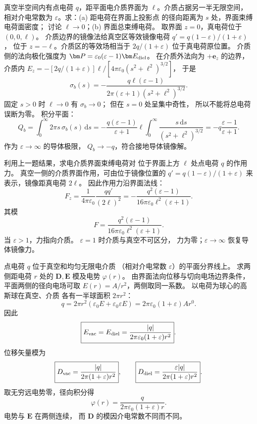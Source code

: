 真空半空间内有点电荷 $q$，距平面电介质界面为
$\ell$。介质占据另一半无限空间，相对介电常数为
$\varepsilon$。求：(a) 距电荷在界面上投影点
的径向距离为 $s$ 处，界面束缚电荷面密度；
讨论 $\ell\to0$；(b) 界面总束缚电荷。
\exsolution
取界面 $z=0$，真电荷位于 $(0,0,\ell)$。
介质边界的镜像法给真空区等效镜像电荷
$q'=q(1-\varepsilon)/(1+\varepsilon)$，
位于 $z=-\ell$。介质区的等效场相当于
$2q/(1+\varepsilon)$ 位于真电荷原位置。
介质侧的法向极化强度为
$\bm P=\varepsilon_0(\varepsilon-1)\bm E_{\rm diel}$。
在介质外法向为 $+\bm e_z$ 的边界，
介质内 $E_z=-[2q/(1+\varepsilon)]
\ell/[4\pi\varepsilon_0(s^2+\ell^2)^{3/2}]$，
于是
\[
\boxed{\sigma_b(s)=
-\frac{q\ell(\varepsilon-1)}
{2\pi(\varepsilon+1)(s^2+\ell^2)^{3/2}}}.
\]
固定 $s>0$ 时 $\ell\to0$ 有 $\sigma_b\to0$；
但在 $s=0$ 处呈集中奇性，
所以不能将总电荷误断为零。
积分平面：
\[
Q_b=\int_0^\infty2\pi s\,\sigma_b(s)\,\mathrm ds
=-\frac{q(\varepsilon-1)}{\varepsilon+1}
\ell\int_0^\infty\frac{s\,\mathrm ds}{(s^2+\ell^2)^{3/2}}
=\boxed{-q\frac{\varepsilon-1}{\varepsilon+1}}.
\]
\excheck 作为 $\varepsilon\to\infty$ 的导体极限，
$Q_b\to-q$，符合接地导体镜像解。

利用上一题结果，求电介质界面束缚电荷对
位于界面上方 $\ell$ 处点电荷 $q$ 的作用力。
\exsolution
真空一侧的介质界面作用，可由位于镜像位置的
$q'=q(1-\varepsilon)/(1+\varepsilon)$
来表示，镜像距真电荷 $2\ell$。
因此作用力沿界面法线：
\[
F_z=\frac1{4\pi\varepsilon_0}
\frac{q q'}{(2\ell)^2}
=-\frac{q^2(\varepsilon-1)}
{16\pi\varepsilon_0\ell^2(\varepsilon+1)}.
\]
其模
\[
\boxed{F=\frac{q^2(\varepsilon-1)}
{16\pi\varepsilon_0\ell^2(\varepsilon+1)}}.
\]
当 $\varepsilon>1$，力指向介质。
\excheck $\varepsilon=1$ 时介质与真空不可区分，
力为零；$\varepsilon\to\infty$ 恢复导体镜像力。

点电荷 $q$ 位于真空和均匀无限电介质
（相对介电常数 $\varepsilon$）的平面分界线上。
求两侧距电荷 $r$ 处的
$\bm D,\bm E$ 模及电势 $\varphi(r)$。
\exsolution
由界面法向位移与切向电场边界条件，
平面两侧的径向电场可取
$E(r)=A/r^2$，两侧取同一系数。
以电荷为球心的高斯球在真空、介质
各有一半球面积 $2\pi r^2$：
\[
q=2\pi r^2(\varepsilon_0E+
\varepsilon_0\varepsilon E)
=2\pi\varepsilon_0(1+\varepsilon)Ar^0.
\]
因此
\[
\boxed{E_{\rm vac}=E_{\rm diel}
=\frac{|q|}{2\pi\varepsilon_0(1+\varepsilon)r^2}}.
\]
位移矢量模为
\[
\boxed{D_{\rm vac}=\frac{|q|}
{2\pi(1+\varepsilon)r^2}},\qquad
\boxed{D_{\rm diel}=\frac{\varepsilon|q|}
{2\pi(1+\varepsilon)r^2}}.
\]
取无穷远电势零，径向积分得
\[
\boxed{\varphi(r)=
\frac{q}{2\pi\varepsilon_0(1+\varepsilon)r}}.
\]
\excheck 电势与 $\bm E$ 在两侧连续，
而 $\bm D$ 的模因介电常数不同而不同。

